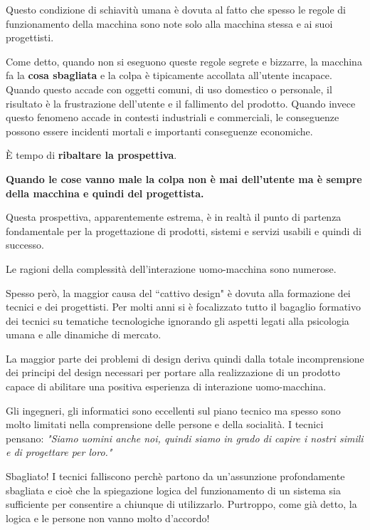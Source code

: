 Questo condizione di schiavitù umana è dovuta al fatto che spesso le regole di funzionamento della macchina sono note solo alla
macchina stessa e ai suoi progettisti. 

Come detto, quando non si eseguono queste regole segrete e bizzarre, la macchina fa la \textbf{cosa sbagliata} e la colpa è
tipicamente accollata all'utente incapace. Quando questo accade con oggetti comuni, di uso domestico o personale, il risultato
è la frustrazione dell'utente e il fallimento del prodotto. Quando invece questo fenomeno accade in contesti industriali e
commerciali, le conseguenze possono essere incidenti mortali e importanti conseguenze economiche.

È tempo di \textbf{ribaltare la prospettiva}. 

\begin{flushleft}
	\textbf{Quando le cose vanno male la colpa non è mai dell'utente ma è sempre della macchina e quindi del progettista.}
\end{flushleft}

Questa prospettiva, apparentemente estrema, è in realtà il punto di partenza fondamentale per la progettazione di prodotti,
sistemi e servizi usabili e quindi di successo. 

Le ragioni della complessità dell'interazione uomo-macchina sono numerose.

Spesso però, la maggior causa del ``cattivo design" è dovuta alla formazione dei tecnici e dei progettisti. Per molti anni si è focalizzato tutto il
bagaglio formativo dei tecnici su tematiche tecnologiche ignorando gli aspetti legati alla psicologia umana e alle dinamiche di mercato.

La maggior parte dei problemi di design deriva quindi dalla totale incomprensione dei principi del design necessari per
portare alla realizzazione di un prodotto capace di abilitare una positiva esperienza di interazione uomo-macchina.

Gli ingegneri, gli informatici sono eccellenti sul piano tecnico ma spesso sono molto limitati nella comprensione delle persone
e della socialità.
I tecnici pensano: \textit{"Siamo uomini anche noi, quindi siamo in grado di capire i nostri simili e di progettare per loro."}

Sbagliato! I tecnici falliscono perchè partono da un'assunzione profondamente sbagliata e cioè che la spiegazione logica del
funzionamento di un sistema sia sufficiente per consentire a chiunque di utilizzarlo. Purtroppo, come già detto, la logica e le
persone non vanno molto d'accordo!

